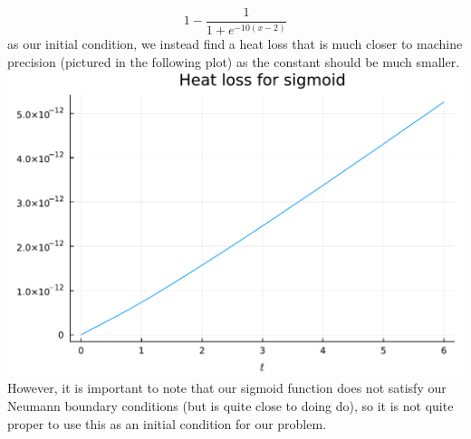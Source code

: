 \documentclass{article}
\begin{document}
\[
1-\frac{1}{1+e^{-10(x-2)}}
\]
as our initial condition, we instead find a heat loss that is much closer to machine precision (pictured in the following plot) as the constant should be much smaller.\\
\includegraphics[scale=0.5]{prob3_sigmoid.pdf}\\
However, it is important to note that our sigmoid function does not satisfy our Neumann boundary conditions (but is quite close to doing do), so it is not quite proper to use this as an initial condition for our problem.

\end{document}
